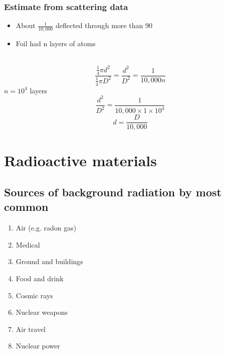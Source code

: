\documentclass{article}[18pt]
\begin{document}
\subsubsection{Estimate from scattering data}
\begin{itemize}
\item About $\frac{1}{10,000}$ deflected through more than 90\degree
\item Foil had n layers of atoms
\end{itemize}
\\
$$\frac{\frac{1}{4}\pi d^2}{\frac{1}{4}\pi D^2}=\frac{d^2}{D^2}=\frac{1}{10,000n}$$
$n=10^4$ layers
$$\frac{d^2}{D^2}=\frac{1}{10,000\times1\times10^4}$$
$$d=\frac{D}{10,000}$$
\newpage
\section{Radioactive materials}
\subsection{Sources of background radiation by most common}
\begin{enumerate}
\item Air (e.g. radon gas)
\item Medical
\item Ground and buildings
\item Food and drink
\item Cosmic rays
\item Nuclear weapons
\item Air travel
\item Nuclear power
\end{enumerate}
\end{document}
